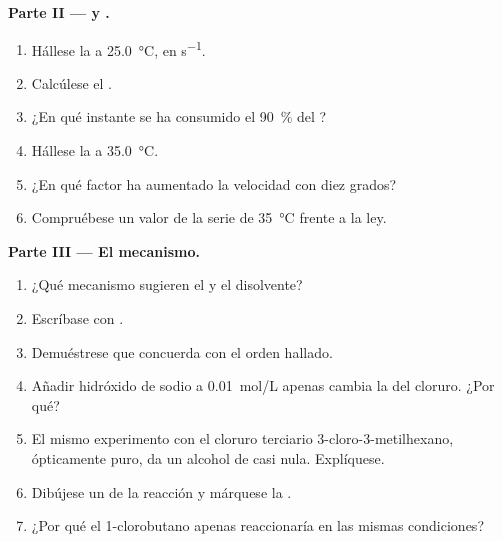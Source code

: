 \begin{problem}
\medskip
\noindent\textbf{Parte II ---  y .}
\begin{enumerate}[resume]
  \item Hállese la  a \qty{25.0}{\celsius}, en
        \unit{s^{-1}}.
  \item Calcúlese el .
  \item ¿En qué instante se ha consumido el \qty{90}{\percent} del
        ?
  \item Hállese la  a \qty{35.0}{\celsius}.
  \item ¿En qué factor ha aumentado la velocidad con diez grados?
  \item Compruébese un valor de la serie de \qty{35}{\celsius} frente a la
        ley.
\end{enumerate}

\medskip
\noindent\textbf{Parte III --- El mecanismo.}
\begin{enumerate}[resume]
  \item ¿Qué mecanismo sugieren el  y el disolvente?
  \item Escríbase con .
  \item Demuéstrese que concuerda con el orden hallado.
  \item Añadir hidróxido de sodio a \qty{0.01}{mol/L} apenas cambia la
         del cloruro. ¿Por qué?
  \item El mismo experimento con el cloruro terciario 
        3-cloro-3-metilhexano, ópticamente puro, da un alcohol de
         casi nula. Explíquese.
  \item Dibújese un  de la reacción y márquese la .
  \item ¿Por qué el 1-clorobutano apenas reaccionaría en las mismas
        condiciones?
\end{enumerate}


\end{problem}
